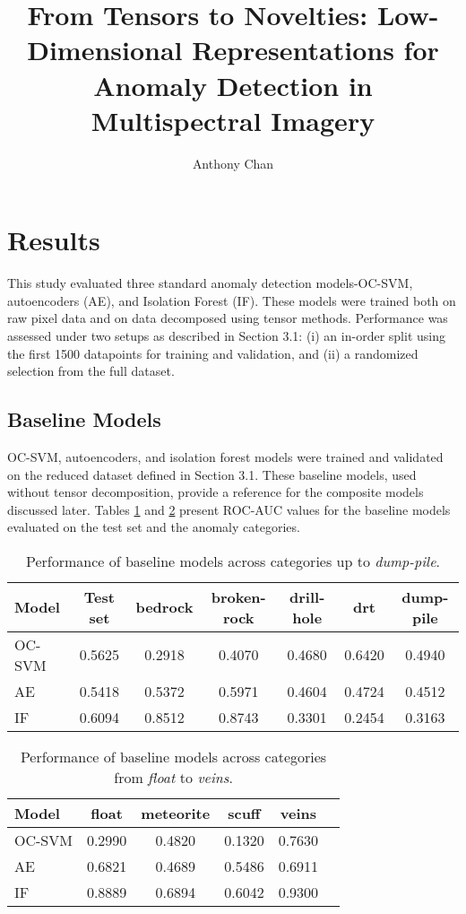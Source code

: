 \documentclass[11pt]{article}
\title{\textbf{From Tensors to Novelties: Low-Dimensional Representations for Anomaly Detection in Multispectral Imagery}}
\author{Anthony Chan}
\affil[1]{Georgia Institute of Technology, OMSA Practicum \\
\texttt{anthonycchan@gmail.com}}
\date{} %
\begin{document}
\maketitle

\section{Results}
\label{sec:results}

This study evaluated three standard anomaly detection models-OC-SVM, autoencoders (AE), and Isolation Forest (IF). These models were trained both on raw pixel data and on data decomposed using tensor methods. Performance was assessed under two setups as described in Section 3.1: (i) an in-order split using the first 1500 datapoints for training and validation, and (ii) a randomized selection from the full dataset.  

\subsection{Baseline Models}
OC-SVM, autoencoders, and isolation forest models were trained and validated on the reduced dataset defined in Section 3.1. These baseline models, used without tensor decomposition, provide a reference for the composite models discussed later. Tables \ref{tab:baseline_result_part1} and \ref{tab:baseline_result_part2} present ROC-AUC values for the baseline models evaluated on the test set and the anomaly categories.

\begin{table}[h!]
\centering
\begin{tabular}{lcccccc}
\hline
\textbf{Model} & \textbf{Test set} & \textbf{bedrock} & \textbf{broken-rock} & \textbf{drill-hole} & \textbf{drt} & \textbf{dump-pile} \\
\hline
OC-SVM & 0.5625 & 0.2918 & 0.4070 & 0.4680 & 0.6420 & 0.4940 \\
AE     & 0.5418 & 0.5372 & 0.5971 & 0.4604 & 0.4724 & 0.4512 \\
IF     & 0.6094 & 0.8512 & 0.8743 & 0.3301 & 0.2454 & 0.3163 \\
\hline
\end{tabular}
\caption{Performance of baseline models across categories up to \textit{dump-pile}.}
\label{tab:baseline_result_part1}
\end{table}

\begin{table}[h!]
\centering
\begin{tabular}{lccccc}
\hline
\textbf{Model} & \textbf{float} & \textbf{meteorite} & \textbf{scuff} & \textbf{veins} \\
\hline
OC-SVM & 0.2990 & 0.4820 & 0.1320 & 0.7630 \\
AE     & 0.6821 & 0.4689 & 0.5486 & 0.6911 \\
IF     & 0.8889 & 0.6894 & 0.6042 & 0.9300 \\
\hline
\end{tabular}
\caption{Performance of baseline models across categories from \textit{float} to \textit{veins}.}
\label{tab:baseline_result_part2}
\end{table}
\end{document}
